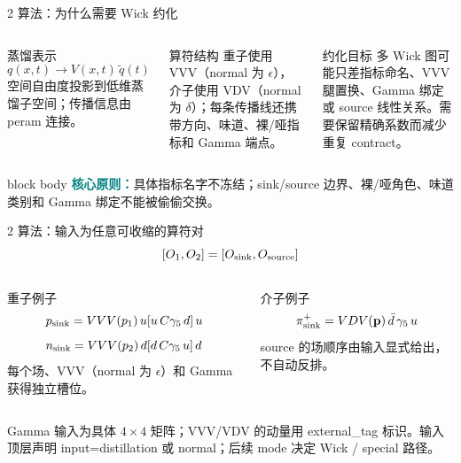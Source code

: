 \documentclass[aspectratio=169,UTF8,fontset=fandol]{ctexbeamer}
\newcommand{\kw}[1]{\textcolor{Teal}{\textbf{#1}}}
\newcommand{\smallnote}[1]{{\scriptsize\color{Muted}#1}}
\begin{document}
\begin{frame}{2 算法：为什么需要 Wick 约化}
\begin{columns}[T,onlytextwidth]
\begin{block}{蒸馏表示}
\[
q(x,t)\longrightarrow V(x,t)\,\widetilde q(t)
\]
空间自由度投影到低维蒸馏子空间；传播信息由 peram 连接。
\end{block}
\begin{block}{算符结构}
重子使用 VVV（normal 为 \(\epsilon\)），介子使用 VDV（normal 为 \(\delta\)）；每条传播线还携带方向、味道、裸/哑指标和 Gamma 端点。
\end{block}
\begin{block}{约化目标}
多 Wick 图可能只差指标命名、VVV 腿置换、Gamma 绑定或 source 线性关系。需要保留精确系数而减少重复 contract。
\end{block}
\end{columns}
\vspace{0.45em}
\begin{beamercolorbox}[sep=0.55em,wd=\linewidth]{block body}
\kw{核心原则：}具体指标名字不冻结；sink/source 边界、裸/哑角色、味道类别和 Gamma 绑定不能被偷偷交换。
\end{beamercolorbox}
\end{frame}
\begin{frame}{2 算法：输入为任意可收缩的算符对}
\[
[O_1,O_2]=[O_{\rm sink},O_{\rm source}]
\]
\begin{columns}[T,onlytextwidth]
\begin{block}{重子例子}
\[
p_{\rm sink}=VVV(p_1)\,u[u\,C\gamma_5\,d]\,u
\]
\[
n_{\rm sink}=VVV(p_2)\,d[d\,C\gamma_5\,u]\,d
\]
每个场、VVV（normal 为 \(\epsilon\)）和 Gamma 获得独立槽位。
\end{block}
\begin{block}{介子例子}
\[
\pi^+_{\rm sink}=VDV(\mathbf p)\,\bar d\,\gamma_5\,u
\]
source 的场顺序由输入显式给出，不自动反排。
\end{block}
\end{columns}
\vspace{0.35em}
\smallnote{Gamma 输入为具体 $4\times4$ 矩阵；VVV/VDV 的动量用 external\_tag 标识。输入顶层声明 input=distillation 或 normal；后续 mode 决定 Wick / special 路径。}
\end{frame}
\end{document}
